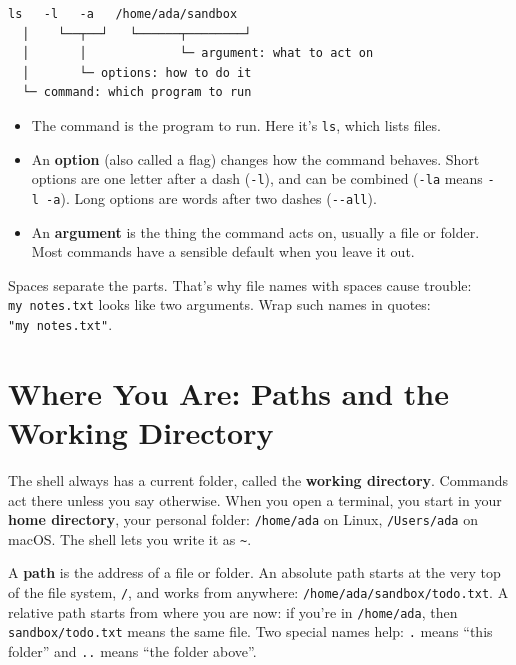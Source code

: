 \begin{codeblock}
\begin{Verbatim}[breaklines=false, fontsize=\fontsize{8.8}{8.68}\selectfont, fontfamily=diagrammono, formatcom=\diagramlines]
  ls   -l   -a   /home/ada/sandbox
  │    └──┬──┘   └──────┬────────┘
  │       │             └─ argument: what to act on
  │       └─ options: how to do it
  └─ command: which program to run
\end{Verbatim}
\end{codeblock}

\begin{itemize}
\tightlist
\item
  The command is the program to run. Here it's \texttt{ls}, which lists files.
\item
  An \textbf{option} (also called a flag) changes how the command behaves. Short options are one letter after a dash (\texttt{-l}), and can be combined (\texttt{-la} means \texttt{-l\ -a}). Long options are words after two dashes (\texttt{-\/-all}).
\item
  An \textbf{argument} is the thing the command acts on, usually a file or folder. Most commands have a sensible default when you leave it out.
\end{itemize}

Spaces separate the parts. That's why file names with spaces cause trouble: \texttt{my\ notes.txt} looks like two arguments. Wrap such names in quotes: \texttt{"my\ notes.txt"}.

\section{Where You Are: Paths and the Working Directory}\label{02-the-shell-talking-to-your-computer-in-words:where-you-are-paths-and-the-working-directory}

The shell always has a current folder, called the \textbf{working directory}. Commands act there unless you say otherwise. When you open a terminal, you start in your \textbf{home directory}, your personal folder: \texttt{/home/ada} on Linux, \texttt{/Users/ada} on macOS. The shell lets you write it as \texttt{\textasciitilde{}}.

A \textbf{path} is the address of a file or folder. An absolute path starts at the very top of the file system, \texttt{/}, and works from anywhere: \texttt{/}\allowbreak{}\texttt{home/}\allowbreak{}\texttt{ada/}\allowbreak{}\texttt{sandbox/}\allowbreak{}\texttt{todo.}\allowbreak{}\texttt{txt}. A relative path starts from where you are now: if you're in \texttt{/home/ada}, then \texttt{sandbox/todo.txt} means the same file. Two special names help: \texttt{.} means ``this folder'' and \texttt{..} means ``the folder above''.

